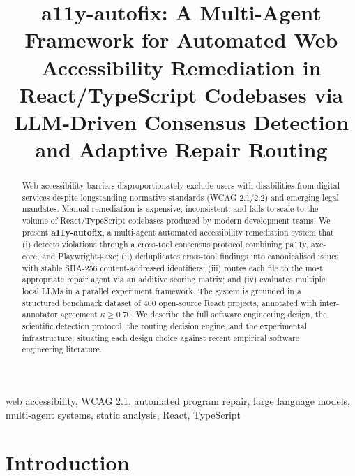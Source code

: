 \documentclass[10pt,conference]{IEEEtran}
\begin{document}
\title{a11y-autofix: A Multi-Agent Framework for Automated Web Accessibility
       Remediation in React/TypeScript Codebases via LLM-Driven Consensus
       Detection and Adaptive Repair Routing}

\author{
}

\maketitle

\begin{abstract}
Web accessibility barriers disproportionately exclude users with disabilities
from digital services despite longstanding normative standards (WCAG 2.1/2.2)
and emerging legal mandates.  Manual remediation is expensive, inconsistent,
and fails to scale to the volume of React/TypeScript codebases produced by
modern development teams.  We present \textbf{a11y-autofix}, a multi-agent
automated accessibility remediation system that (i) detects violations through
a cross-tool consensus protocol combining pa11y, axe-core, and
Playwright+axe; (ii) deduplicates cross-tool findings into canonicalised
issues with stable SHA-256 content-addressed identifiers; (iii) routes each
file to the most appropriate repair agent via an additive scoring matrix; and
(iv) evaluates multiple local LLMs in a parallel experiment framework.  The
system is grounded in a structured benchmark dataset of 400 open-source React
projects, annotated with inter-annotator agreement $\kappa \geq 0.70$.  We
describe the full software engineering design, the scientific detection
protocol, the routing decision engine, and the experimental infrastructure,
situating each design choice against recent empirical software engineering
literature.
\end{abstract}

\begin{IEEEkeywords}
web accessibility, WCAG 2.1, automated program repair, large language models,
multi-agent systems, static analysis, React, TypeScript
\end{IEEEkeywords}

\section{Introduction}
\label{sec:intro}
\end{document}
